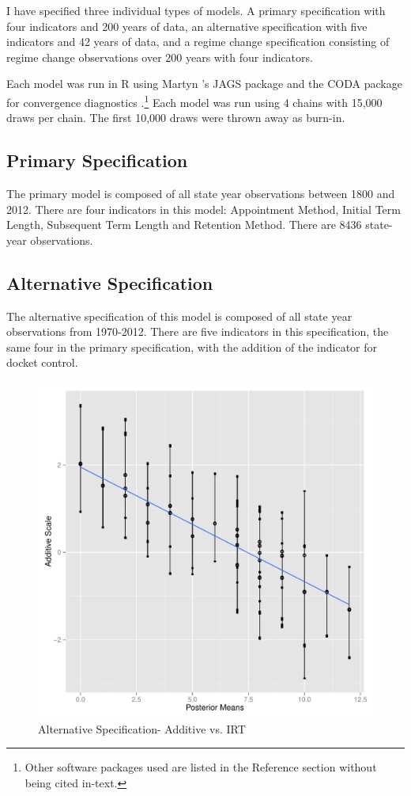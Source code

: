 \documentclass[JohnsonMADraft2]{subfiles}
\begin{document}
I have specified three individual types of models.  A primary specification with four indicators and 200 years of data, an alternative specification with five indicators and 42 years of data, and a regime change specification consisting of regime change observations over 200 years with four indicators.

Each model was run in R using Martyn \citeauthor{r-rjags}'s JAGS package and the CODA package for convergence diagnostics \cite{R,r-CODA}.\footnote{Other software packages used are listed in the Reference section without being cited in-text.}\nocite{R,r-CODA,r-Foreign,r-R2jags,r-ggplot2,r-dplyr,r-rjagsr-doParallel,r-rcurl,r-random,r-superdiag}  Each model was run using 4 chains with 15,000 draws per chain.  The first 10,000 draws were thrown away as burn-in.

\subsection{Primary Specification}
The primary model is composed of all state year observations between 1800 and 2012.  There are four indicators in this model: Appointment Method, Initial Term Length, Subsequent Term Length and Retention Method.  There are 8436 state-year observations.  

\subsection{Alternative Specification}
The alternative specification of this model is composed of all state year observations from 1970-2012. There are five indicators in this specification, the same four in the primary specification, with the addition of the indicator for docket control.  

\begin{figure}
\centering
\caption{Alternative Specification- Additive vs. IRT}
\label{fig:fiveind_additive_ggplot}
\includegraphics[width=0.7\linewidth]{graphics/fiveind/fiveind_additive_ggplot}
\end{figure}
\end{document}
